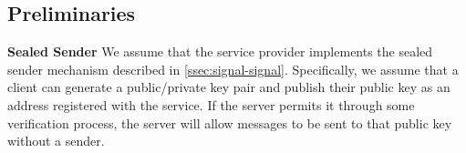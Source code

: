 



\subsection{Preliminaries}

\noindent
\textbf{Sealed Sender}
We assume that the service provider implements the sealed sender
mechanism described in \cref{ssec:signal-signal}.  Specifically, we assume that a client can generate a public/private key
pair and publish their public key as an address registered with the
service. If the server permits it through some verification process, the
server will allow messages to be sent to that public key without a sender.

